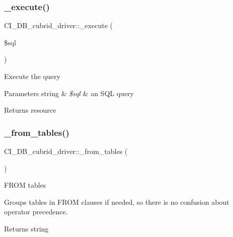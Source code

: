 \subsubsection{\texorpdfstring{\+\_\+execute()}{\_execute()}}
{\footnotesize\ttfamily C\+I\+\_\+\+D\+B\+\_\+cubrid\+\_\+driver\+::\+\_\+execute (\begin{DoxyParamCaption}\item[{}]{\$sql }\end{DoxyParamCaption})\hspace{0.3cm}{\ttfamily [protected]}}

Execute the query


\begin{DoxyParams}[1]{Parameters}
string & {\em \$sql} & an S\+QL query \\
\hline
\end{DoxyParams}
\begin{DoxyReturn}{Returns}
resource 
\end{DoxyReturn}
\mbox{\label{class_c_i___d_b__cubrid__driver_a7f5c12db6fee50e13e3908517325f1e6}} 
\subsubsection{\texorpdfstring{\+\_\+from\+\_\+tables()}{\_from\_tables()}}
{\footnotesize\ttfamily C\+I\+\_\+\+D\+B\+\_\+cubrid\+\_\+driver\+::\+\_\+from\+\_\+tables (\begin{DoxyParamCaption}{ }\end{DoxyParamCaption})\hspace{0.3cm}{\ttfamily [protected]}}

F\+R\+OM tables

Groups tables in F\+R\+OM clauses if needed, so there is no confusion about operator precedence.

\begin{DoxyReturn}{Returns}
string 
\end{DoxyReturn}
\mbox{\label{class_c_i___d_b__cubrid__driver_a7efaa7e06059cc9e9693cc97018b2e8a}} 
